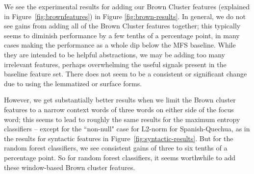 We see the experimental results for adding our Brown Cluster features
(explained in Figure~\ref{fig:brownfeatures}) in Figure
\ref{fig:brown-results}.
In general, we do not see gains from adding all of the Brown Cluster features
together; this typically seems to diminish performance by a few tenths of a
percentage point, in many cases making the performance as a whole dip below the
MFS baseline. While they are intended to be helpful abstractions, we may be
adding too many irrelevant features, perhaps overwhelming the useful signals
present in the baseline feature set. There does not seem to be a consistent or
significant change due to using the lemmatized or surface forms.

However, we get substantially better results when we limit the Brown cluster
features to a narrow context words of three words on either side of the focus
word; this seems to lead to roughly the same results for the maximum entropy
classifiers -- except for the ``non-null" case for L2-norm for Spanish-Quechua,
as in the results for syntactic features in Figure~\ref{fig:syntactic-results}.
But for the random forest classifiers, we see consistent gains of three to six
tenths of a percentage point. So for random forest classifiers, it seems
worthwhile to add these window-based Brown cluster features.

